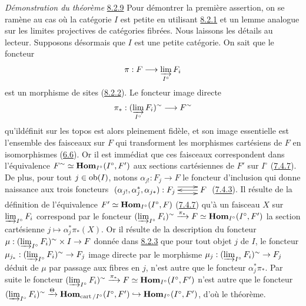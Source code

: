 \documentclass[10pt]{../fichiers-configuration-latex/smfart}
\begin{document}
\subsubsection{}
\emph{Démonstration du théorème} \hyperref[VI.thm8.2.9]{8.2.9}
Pour démontrer la première assertion, on se ramène au cas où la
catégorie $I$ est petite en utilisant \hyperref[VI.lem8.2.1]{8.2.1} et un lemme analogue sur
les limites projectives de catégories fibrées. Nous laissons les
détails au lecteur. Supposons désormais que $I$ est une petite
catégorie. On sait que le foncteur
$$
\pi : F \to \varinjlim_{I^{\circ}} F_i
$$
est un morphisme de sites (\hyperref[VI.lem8.2.2]{8.2.2}). Le foncteur image directe
$$
\pi_{\ast} : (\varinjlim_{I^{\circ}} F_i)^{\sim} \to F^{\sim}
$$
qu'il\pageoriginale définit sur les topos est alors pleinement
fidèle, et son image essentielle est l'ensemble des faisceaux sur
$F$ qui transforment les morphismes cartésiens de $F$ en
isomorphismes (\hyperref[VI.exe6.6]{6.6}). Or il est immédiat que ces
faisceaux correspondent dans l'équivalence $F^{\sim} \simeq
\operatorname{\mathbf{Hom}}_{I^{\circ}}(I^{\circ}, F')$ aux sections cartésiennes de $F'$
sur $I^{\circ}$ (\hyperref[VI.prop7.4.7]{7.4.7}). De plus, pour tout $j \in \operatorname{ob}
(I)$, notons $\alpha_{j!} : F_j \to F$ le foncteur d'inclusion qui
donne naissance aux trois foncteurs $\xymatrix{ (\alpha_{j!},
\alpha^{\ast}_j, \alpha_{j\ast}) : F_j  \ar@<4pt>[r] \ar@<-4pt>[r]&
F \ar[l] }$ (\hyperref[VI.rem7.4.3]{7.4.3}). Il résulte de la définition de
l'équivalence $F' \simeq \operatorname{\mathbf{Hom}}_{I^{\circ}}(I^{\circ},F)$
(\hyperref[VI.prop7.4.7]{7.4.7}) qu'à un faisceau $X$  sur
$\varinjlim_{I^{\circ}} F_i$ correspond par le foncteur
$(\varinjlim_{I^{\circ}} F_i)^{\sim} \xrightarrow{\pi_{\ast}} F
\simeq \operatorname{\mathbf{Hom}}_{I^{\circ}} (I^{\circ}, F')$ la section cartésienne $j
\mapsto \alpha^{\ast}_{j} \pi_{\ast}(X)$. Or il résulte de la
description du foncteur $\mu : (\varinjlim_{I^{\circ}} F_i)^{\sim}
\times I \to F$ donnée dans \hyperref[VI.thm8.2.3]{8.2.3} que pour tout objet
$j$ de $I$, le foncteur $\mu_{j_\ast} : (\varinjlim_{I^{\circ}}
F_i)^{\sim} \to F_j$ image directe par le morphisme $\mu_j :
(\varinjlim_{I^{\circ}} F_i)^{\sim} \to F_j$ déduit de $\mu$ par
passage aux fibres en $j$, n'est autre que le foncteur
$\alpha^{\ast}_j \pi_{\ast}$. Par suite le foncteur
$(\varinjlim_{I^{\circ}} F_i)^{\sim} \xrightarrow{\pi_{\ast}} F
\simeq \operatorname{\mathbf{Hom}}_{I^{\circ}} (I^{\circ}, F')$ n'est autre que le
foncteur $(\varinjlim_{I^{\circ}} F_i)^{\sim} \xrightarrow{\Theta}
\operatorname{\mathbf{Hom}}_{\operatorname{cart}/I^{\circ}} (I^{\circ}, F') \hookrightarrow
\operatorname{\mathbf{Hom}}_{I^{\circ}}(I^{\circ}, F')$, d'où le théorème.
\end{document}
